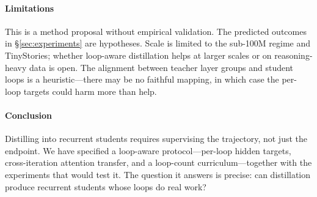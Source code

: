 \paragraph{Limitations}

This is a method proposal without empirical validation. The predicted
outcomes in \S\ref{sec:experiments} are hypotheses. Scale is limited
to the sub-100M regime and TinyStories; whether loop-aware
distillation helps at larger scales or on reasoning-heavy data is
open. The alignment between teacher layer groups and student loops is
a heuristic---there may be no faithful mapping, in which case the
per-loop targets could harm more than help.

\paragraph{Conclusion}

Distilling into recurrent students requires supervising the
trajectory, not just the endpoint. We have specified a loop-aware
protocol---per-loop hidden targets, cross-iteration attention
transfer, and a loop-count curriculum---together with the experiments
that would test it. The question it answers is precise: can
distillation produce recurrent students whose loops do real work?
